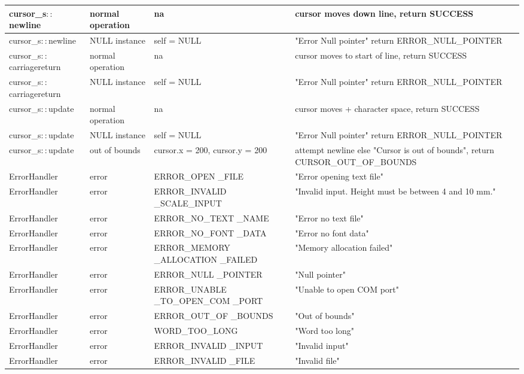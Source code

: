 \begin{longtable}{|>{\raggedright\arraybackslash}m{}|>{\raggedright\arraybackslash}m{}|>{\raggedright\arraybackslash}m{}|>{\raggedright\arraybackslash}m{}|}
        cursor\_s$::$newline & normal operation & na & cursor moves down line, return SUCCESS \\ \hline
        cursor\_s$::$newline & NULL instance & self = NULL & "Error Null pointer" return ERROR\_NULL\_POINTER \\ \hline
        cursor\_s$::$ carriagereturn & normal operation & na & cursor moves to start of line, return SUCCESS \\ \hline
        cursor\_s$::$ carriagereturn & NULL instance & self = NULL & "Error Null pointer" return ERROR\_NULL\_POINTER \\ \hline
        cursor\_s$::$update & normal operation & na & cursor moves + character space, return SUCCESS \\ \hline
        cursor\_s$::$update & NULL instance & self = NULL & "Error Null pointer" return ERROR\_NULL\_POINTER \\ \hline
        cursor\_s$::$update & out of bounds & cursor.x = 200, cursor.y = 200 & attempt newline else "Cursor is out of bounds", return CURSOR\_OUT\_OF\_BOUNDS \\ \hline
        ErrorHandler & error & ERROR\_OPEN \_FILE  & "Error opening text file"  \\ \hline
        ErrorHandler & error & ERROR\_INVALID \_SCALE\_INPUT  & "Invalid input. Height must be between 4 and 10 mm." \\ \hline
        ErrorHandler & error & ERROR\_NO\_TEXT \_NAME  & "Error no text file" \\ \hline
        ErrorHandler & error & ERROR\_NO\_FONT \_DATA  & "Error no font data" \\ \hline
        ErrorHandler & error & ERROR\_MEMORY \_ALLOCATION \_FAILED & "Memory allocation failed" \\ \hline
        ErrorHandler & error & ERROR\_NULL \_POINTER  & "Null pointer" \\ \hline
        ErrorHandler & error & ERROR\_UNABLE \_TO\_OPEN\_COM \_PORT  & "Unable to open COM port" \\ \hline
        ErrorHandler & error & ERROR\_OUT\_OF \_BOUNDS  & "Out of bounds" \\ \hline
        ErrorHandler & error & WORD\_TOO\_LONG  & "Word too long" \\ \hline
        ErrorHandler & error & ERROR\_INVALID \_INPUT  & "Invalid input" \\ \hline
        ErrorHandler & error & ERROR\_INVALID \_FILE  & "Invalid file" \\ \hline

\end{longtable}
